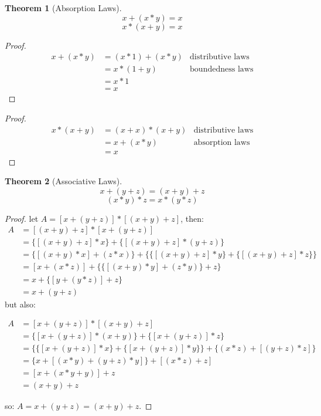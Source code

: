 \documentclass{article}
\newtheorem{theorem}{Theorem}[section]
\begin{document}
\newpage
\begin{theorem}[Absorption Laws]
\label{absorption}
\[ x + (x * y) = x \]
\[ x * (x + y) = x \]
\end{theorem}

\begin{proof}
\begin{align*}
x + (x * y) & = (x * 1) + (x * y) & \text{distributive laws} \\
            & = x * (1 + y) & \text{boundedness laws} \\
            & = x * 1 \\
            & = x
\end{align*}
\end{proof}

\begin{proof}
\begin{align*}
x * (x + y) & = (x + x) * (x + y) & \text{distributive laws} \\
            & = x + (x * y) & \text{absorption laws} \\
            & = x
\end{align*}
\end{proof}

\newpage

\begin{theorem}[Associative Laws]
\label{associative}
\[ x + (y + z) = (x + y) + z \]
\[ (x * y) * z = x * (y * z) \]
\end{theorem}

\begin{proof}
let $A = [x + (y + z)] * [(x + y) + z]$, then:
\begin{align*}
A & = [(x + y) + z] * [x + (y + z)] \\
  & = \{[(x + y) + z] * x\} + \{[(x + y) + z] * (y + z)\} \\
  & = \{[(x + y) * x] + (z * x)\} + \{ \{[(x + y) + z] * y\} + \{[(x + y) + z] * z\} \} \\
  & = [x + (x * z)] + \{\{[(x + y) * y] + (z * y)\} + z\} \\
  & = x + \{[y + (y * z)] + z\} \\
  & = x + (y + z)
\end{align*}
but also:

\begin{align*}
A & = [x + (y + z)] * [(x + y) + z] \\
  & = \{[x + (y + z)] * (x + y)\} + \{[x + (y + z)] * z\} \\
  & = \{\{[x + (y + z)] * x\} + \{[x + (y + z)] * y\}\} + \{(x * z) + [(y + z) * z]\}\\
  & = \{x + [(x * y) + (y + z) * y]\} + [(x * z) + z]\\
  & = [x + (x * y + y)] + z\\
  & = (x + y) + z
\end{align*}

so: $A = x + (y + z) = (x + y) + z$.
\end{proof}
\end{document}

